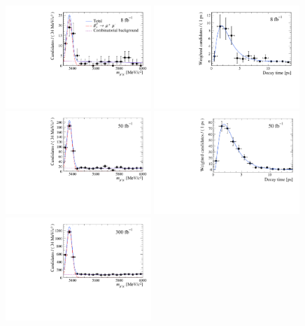 \begin{figure}[tbp]
    \centering
        \includegraphics[width=0.49\textwidth]{./Figs/Summary/8fb_mass.pdf}
        \includegraphics[width=0.49\textwidth]{./Figs/Summary/8fb_time.pdf}
        \includegraphics[width=0.49\textwidth]{./Figs/Summary/50fb_mass.pdf}
        \includegraphics[width=0.49\textwidth]{./Figs/Summary/50fb_time.pdf}
        \includegraphics[width=0.49\textwidth]{./Figs/Summary/300fb_mass.pdf}

\end{figure}

